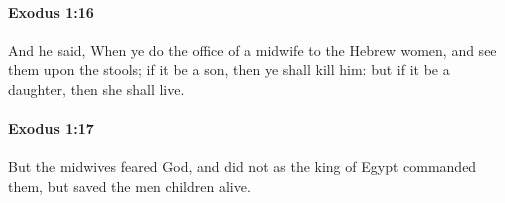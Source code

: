 		\paragraph{Exodus 1:16} %
			\label{EXODUS-1-16}

			And he said, When ye do the office of a midwife to the Hebrew women, and see them upon the stools; if it be a son, then ye shall kill him: but if it be a daughter, then she shall live.


		\paragraph{Exodus 1:17} %
			\label{EXODUS-1-17}

			But the midwives feared God, and did not as the king of Egypt commanded them, but saved the men children alive.


